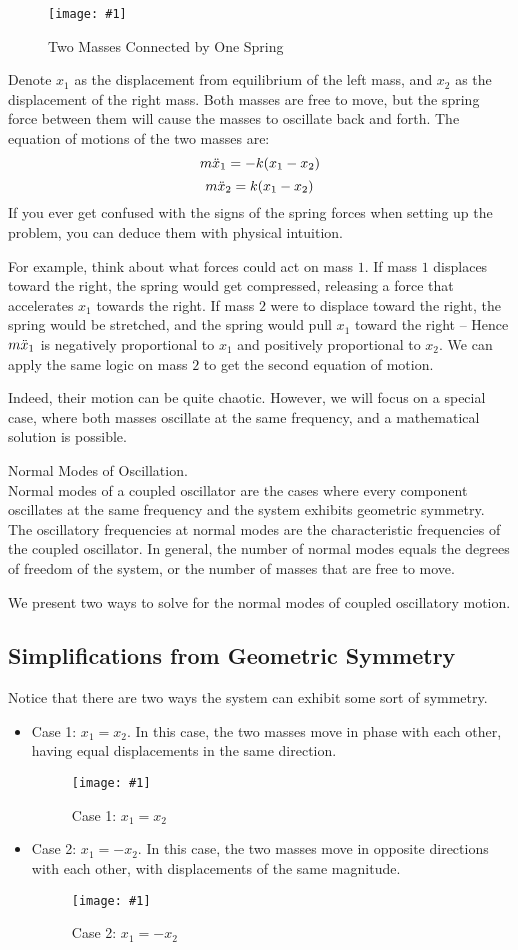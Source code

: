 \documentclass[11pt]{article}
\newcommand{\fig}[4]{
    \begin{figure}[H]
        \centering
        \texttt{[image: \#1]}
        \caption{#2}
        \label{exp4fit}
    \end{figure}
}
\theoremstyle{gangnamstyle}{\newtheorem{definition}{Definition}[]}
\theoremstyle{gangnamstyle}{\newtheorem{example}{Example}[]}
\theoremstyle{gangnamstyle}{\newtheorem{problem}{Problem}[]}
\theoremstyle{gangnamstyle}{\newtheorem{warning}{Warning}[]}
\begin{document}
\fig{figs/n3/twomass.jpg}{Two Masses Connected by One Spring}{1}{0}

Denote $x_1$ as the displacement from equilibrium of the left mass, and $x_2$ as the displacement of the right mass. Both masses are free to move, but the spring force between them will cause the masses to oscillate back and forth. The equation of motions of the two masses are: 
\[ m\Ddot{x}_1 = -k(x_1 - x_2) \]
\[ m\Ddot{x}_2 = k(x_1 - x_2) \]
If you ever get confused with the signs of the spring forces when setting up the problem, you can deduce them with physical intuition. 

For example, think about what forces could act on mass $1$. If mass $1$ displaces toward the right, the spring would get compressed, releasing a force that accelerates $x_1$ towards the right. If mass $2$ were to displace toward the right, the spring would be stretched, and the spring would pull $x_1$ toward the right -- Hence $m\Ddot{x}_1$ is negatively proportional to $x_1$ and positively proportional to $x_2$. We can apply the same logic on mass $2$ to get the second equation of motion. 

Indeed, their motion can be quite chaotic. However, we will focus on a special case, where both masses oscillate at the same frequency, and a mathematical solution is possible. 

\begin{definition}
Normal Modes of Oscillation. \\
Normal modes of a coupled oscillator are the cases where every component oscillates at the same frequency and the system exhibits geometric symmetry. The oscillatory frequencies at normal modes are the characteristic frequencies of the coupled oscillator. In general, the number of normal modes equals the degrees of freedom of the system, or the number of masses that are free to move. 
\end{definition}

We present two ways to solve for the normal modes of coupled oscillatory motion. 

\subsection{Simplifications from Geometric Symmetry}

Notice that there are two ways the system can exhibit some sort of symmetry. 

\begin{itemize}
\item Case 1: $x_1 = x_2$. In this case, the two masses move in phase with each other, having equal displacements in the same direction. 
\fig{figs/n3/same.jpg}{Case 1: $x_1 = x_2$}{1}{0}
\item Case 2: $x_1 = -x_2$. In this case, the two masses move in opposite directions with each other, with displacements of the same magnitude. 
\fig{figs/n3/opposite.jpg}{Case 2: $x_1 = -x_2$}{1}{0}
\end{itemize}
\end{document}
